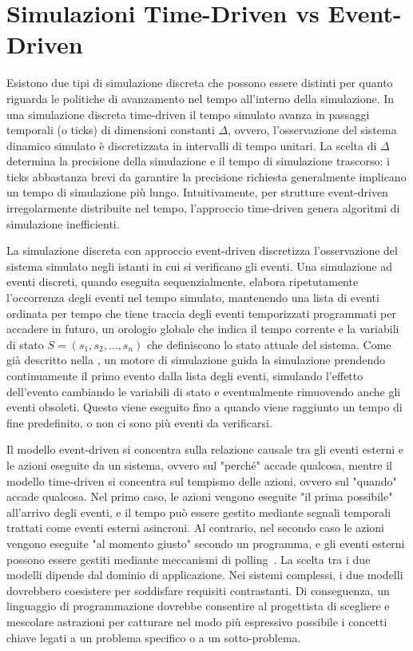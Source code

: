 \documentclass[12pt,a4paper,openright,twoside]{book}
\begin{document}
\section{Simulazioni Time-Driven vs Event-Driven}
Esistono due tipi di simulazione discreta che possono essere distinti per quanto riguarda le politiche di avanzamento nel tempo all'interno della simulazione. In una simulazione discreta time-driven il tempo simulato avanza in passaggi temporali (o ticks) di dimensioni constanti $\Delta$, ovvero, l'osservazione del sistema dinamico simulato è discretizzata in intervalli di tempo unitari. La scelta di $\Delta$ determina la precisione della simulazione e il tempo di simulazione trascorso: i ticks abbastanza brevi da garantire la precisione richiesta generalmente implicano un tempo di simulazione più lungo. Intuitivamente, per strutture event-driven irregolarmente distribuite nel tempo, l'approccio time-driven genera algoritmi di simulazione inefficienti. 

La simulazione discreta con approccio event-driven discretizza l'osservazione del sistema simulato negli istanti in cui si verificano gli eventi. Una simulazione ad eventi discreti, quando eseguita sequenzialmente, elabora ripetutamente l'occorrenza degli eventi nel tempo simulato, mantenendo una lista di eventi ordinata per tempo che tiene traccia degli eventi temporizzati programmati per accadere in futuro, un orologio globale che indica il tempo corrente e la variabili di stato $S = (s_1, s_2, \dots, s_n)$ che definiscono lo stato attuale del sistema. Come già descritto nella , un motore di simulazione guida la simulazione prendendo continuamente il primo evento dalla lista degli eventi, simulando l'effetto dell'evento cambiando le variabili di stato e eventualmente rimuovendo anche gli eventi obsoleti. Questo viene eseguito fino a quando viene raggiunto un tempo di fine predefinito, o non ci sono più eventi da verificarsi.

Il modello event-driven si concentra sulla relazione causale tra gli eventi esterni e le azioni eseguite da un sistema, ovvero sul "perché" accade qualcosa, mentre il modello time-driven si concentra sul tempismo delle azioni, ovvero sul "quando" accade qualcosa. Nel primo caso, le azioni vengono eseguite "il prima possibile" all'arrivo degli eventi, e il tempo può essere gestito mediante segnali temporali trattati come eventi esterni asincroni. Al contrario, nel secondo caso le azioni vengono eseguite "al momento giusto" secondo un programma, e gli eventi esterni possono essere gestiti mediante meccanismi di polling~\cite{TISATO199531}.
La scelta tra i due modelli dipende dal dominio di applicazione. Nei sistemi complessi, i due modelli dovrebbero coesistere per soddisfare requisiti contrastanti. Di conseguenza, un linguaggio di programmazione dovrebbe consentire al progettista di scegliere e mescolare astrazioni per catturare nel modo più espressivo possibile i concetti chiave legati a un problema specifico o a un sotto-problema. 
\end{document}
